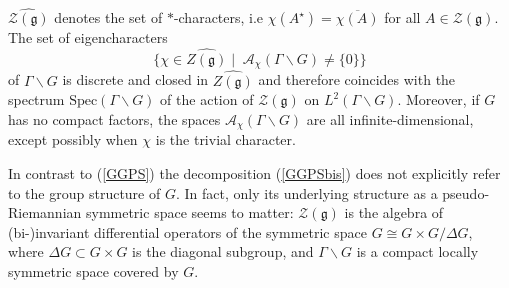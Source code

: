 \documentclass[10]{amsart}
\theoremstyle{remark}
\theoremstyle{definition}
\numberwithin{equation}{section}
\newcommand{\fg}{{\mathfrak g}}
\newcommand{\Cal}{\mathcal}
\begin{document}
$\widehat{{\Cal Z}({\mathfrak g})}$ denotes the set of $*$-characters, i.e $\displaystyle{\chi(A^\star)=\overline{\chi(A)}}$ for all $A\in {\Cal Z}({\mathfrak g})$. 
The set of eigencharacters 
%
\begin{equation*}
\{\chi\in\widehat{Z({\mathfrak g})}\mid\;{\mathcal A}_{\chi}(\Gamma\backslash G)\neq\{0\}\} 
\end{equation*}
%
of $\Gamma\backslash G$ is discrete and closed in $\widehat{Z({\mathfrak g})}$ and therefore coincides with the spectrum $\text{Spec}(\Gamma\backslash G)$ of the action of ${\Cal Z}({\mathfrak g})$ on $L^2(\Gamma\backslash G)$. Moreover, if $G$ has no compact factors, the spaces ${\mathcal A}_{\chi}(\Gamma\backslash G)$ are all infinite-dimensional, except possibly when $\chi$ is the trivial character.

In contrast to (\ref{GGPS}) the decomposition (\ref{GGPSbis}) does not explicitly refer to the group structure of $G$. In fact, only its underlying structure as a pseudo-Riemannian symmetric 
space seems to matter: $\Cal Z(\fg)$ is the algebra of (bi-)invariant differential operators of the symmetric space $G\cong G\times G/\Delta G$, where $\Delta G\subset G\times G$ is the diagonal subgroup, and $\Gamma\backslash G$ is a compact locally symmetric space
covered by $G$. 

\end{document}
